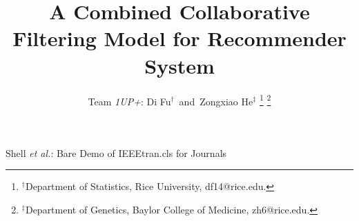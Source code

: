 \documentclass[journal]{IEEEtran}
\begin{document}
%
\title{A Combined Collaborative Filtering Model for Recommender System}
%
%
%

\author{Team {\it 1UP+}: Di Fu$^{\dagger}$~and~Zongxiao He$^{\ddagger}$%
\thanks{$^{\dagger}$Department of Statistics, Rice University, df14@rice.edu.}
\thanks{$^{\ddagger}$Department of Genetics, Baylor College of Medicine, zh6@rice.edu.}}

% 
%



%
{Shell \MakeLowercase{\textit{et al.}}: Bare Demo of IEEEtran.cls for Journals}
% 
\end{document}
